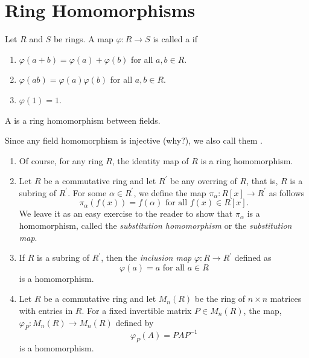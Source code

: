 \section{Ring Homomorphisms}

\begin{defn}
    Let $R$ and $S$ be rings. A map $\varphi \colon R \to S$ is called a  if 
    \begin{enumerate}
        \item $\varphi(a+b) = \varphi(a) + \varphi(b)$ for all $a,b \in R$.
        \item $\varphi(ab) = \varphi(a)\varphi(b)$ for all $a,b \in R$.
        \item $\varphi(1) = 1$.\footnotemark
    \end{enumerate}
    A  is a ring homomorphism between fields.
\end{defn}

\begin{defn}
    Since any field homomorphism is injective (why?), we also call them .
\end{defn}

\begin{ex}
\phantom{hi}
\begin{enumerate}
    \item Of course, for any ring $R$, the identity map of $R$ is a ring homomorphism.
    \item Let $R$ be a commutative ring and let $R^{\prime}$ be any overring of $R$, that is, $R$ is a subring of $R^{\prime}$. For some $\alpha \in R^{\prime}$, we define the map $\pi_{\alpha} \colon R[x] \to R^{\prime}$ as follows
    \[
        \pi_{\alpha} \left( f(x) \right) = f(\alpha) \text{ for all } f(x) \in R[x].
    \]
    We leave it as an easy exercise to the reader to show that $\pi_{\alpha}$ is a homomorphism, called the \emph{substitution homomorphism} or the \emph{substitution map}.
    \item If $R$ is a subring of $R^{\prime}$, then the \emph{inclusion map} $\varphi \colon R \to R^{\prime}$ defined as
    \[
        \varphi(a) = a \text{ for all } a \in R
    \]  
    is a homomorphism.
    \item Let $R$ be a commutative ring and let $M_n(R)$ be the ring of $n\times n$ matrices with entries in $R$. For a fixed invertible matrix $P \in M_n(R)$, the map, $\varphi_P \colon M_n(R) \to M_n(R)$ defined by
    \[
        \varphi_P(A) = PAP^{-1}
    \]
    is a homomorphism.
\end{enumerate}
\end{ex}

